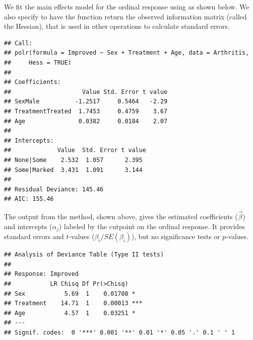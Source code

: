 \documentclass[11pt]{book}
\renewenvironment{knitrout}{\small\renewcommand{\baselinestretch}{.85}}{} %
\begin{document}
We fit the main effects model for the ordinal response using  as shown below.
We also specify  to have the function return the observed information
matrix (called the Hessian), that is used in other operations to calculate standard errors.
\begin{knitrout}
\color{fgcolor}\begin{kframe}
\begin{alltt}
 \hlkwb{<-}  \hlopt{~}  \hlopt{+}  \hlopt{+} 
                   \hlstd{=}\hlstd{)}
\end{alltt}
\begin{verbatim}
## Call:
## polr(formula = Improved ~ Sex + Treatment + Age, data = Arthritis, 
##     Hess = TRUE)
## 
## Coefficients:
##                    Value Std. Error t value
## SexMale          -1.2517     0.5464   -2.29
## TreatmentTreated  1.7453     0.4759    3.67
## Age               0.0382     0.0184    2.07
## 
## Intercepts:
##             Value  Std. Error t value
## None|Some    2.532  1.057      2.395 
## Some|Marked  3.431  1.091      3.144 
## 
## Residual Deviance: 145.46 
## AIC: 155.46
\end{verbatim}
\end{kframe}
\end{knitrout}
The output from the  method, shown above, gives the estimated
coefficients ($\vec{\beta}$) and intercepts ($\alpha_j$) labeled by the 
cutpoint on the ordinal response. It provides standard errors and $t$-values
($\beta_i / SE(\beta_i)$), but no significance tests or $p$-values.

\begin{knitrout}
\color{fgcolor}\begin{kframe}
\begin{alltt}
\end{alltt}
\begin{verbatim}
## Analysis of Deviance Table (Type II tests)
## 
## Response: Improved
##           LR Chisq Df Pr(>Chisq)    
## Sex           5.69  1    0.01708 *  
## Treatment    14.71  1    0.00013 ***
## Age           4.57  1    0.03251 *  
## ---
## Signif. codes:  0 '***' 0.001 '**' 0.01 '*' 0.05 '.' 0.1 ' ' 1
\end{verbatim}
\end{kframe}
\end{knitrout}
\end{document}
